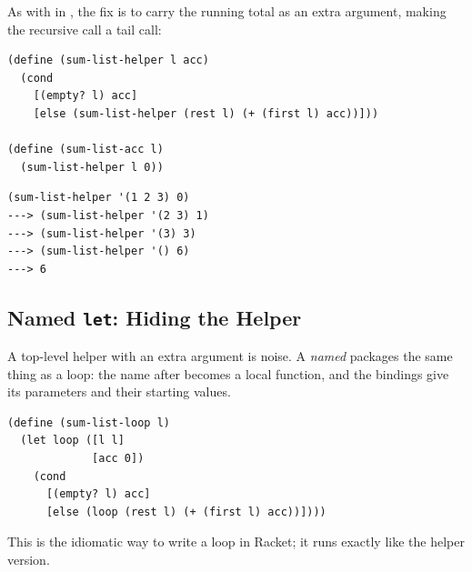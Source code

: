 As with  in , the fix is to carry the running total as an extra argument, making the recursive call a tail call:
\begin{lstlisting}
(define (sum-list-helper l acc)
  (cond
    [(empty? l) acc]
    [else (sum-list-helper (rest l) (+ (first l) acc))]))

(define (sum-list-acc l)
  (sum-list-helper l 0))
\end{lstlisting}
\begin{lstlisting}[style=repl]
(sum-list-helper '(1 2 3) 0)
---> (sum-list-helper '(2 3) 1)
---> (sum-list-helper '(3) 3)
---> (sum-list-helper '() 6)
---> 6
\end{lstlisting}

\subsection{Named \texttt{let}: Hiding the Helper}

A top-level helper with an extra argument is noise. A \emph{named } packages the same thing as a loop: the name after  becomes a local function, and the bindings give its parameters and their starting values.
\begin{lstlisting}
(define (sum-list-loop l)
  (let loop ([l l]
             [acc 0])
    (cond
      [(empty? l) acc]
      [else (loop (rest l) (+ (first l) acc))])))
\end{lstlisting}
This is the idiomatic way to write a loop in Racket; it runs exactly like the helper version.
